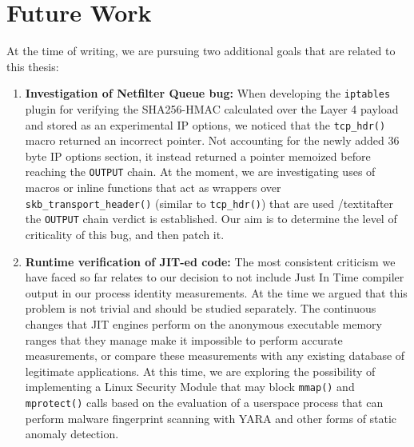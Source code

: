 \section{Future Work}
\label{conclusion:future}

At the time of writing, we are pursuing two additional goals that are related
to this thesis:

\begin{enumerate}
    \item \textbf{Investigation of Netfilter Queue bug:} When developing the
    \texttt{iptables} plugin for verifying the SHA256-HMAC calculated over
    the Layer 4 payload and stored as an experimental IP options, we noticed
    that the \texttt{tcp\_hdr()} macro returned an incorrect pointer. Not
    accounting for the newly added 36 byte IP options section, it instead
    returned a pointer memoized before reaching the \texttt{OUTPUT} chain. At
    the moment, we are investigating uses of macros or inline functions that
    act as wrappers over \texttt{skb\_transport\_header()} (similar to
    \texttt{tcp\_hdr()}) that are used /textit{after} the \texttt{OUTPUT} chain
    verdict is established. Our aim is to determine the level of criticality of
    this bug, and then patch it.

    \item \textbf{Runtime verification of JIT-ed code:} The most consistent
    criticism we have faced so far relates to our decision to not include
    Just In Time compiler output in our process identity measurements. At the time
    we argued that this problem is not trivial and should be studied separately.
    The continuous changes that JIT engines perform on the anonymous executable
    memory ranges that they manage make it impossible to perform accurate
    measurements, or compare these measurements with any existing database of
    legitimate applications. At this time, we are exploring the possibility of
    implementing a Linux Security Module that may block \texttt{mmap()} and
    \texttt{mprotect()} calls based on the evaluation of a userspace process
    that can perform malware fingerprint scanning with YARA \cite{naik2020embedding}
    and other forms of static anomaly detection.
\end{enumerate}
